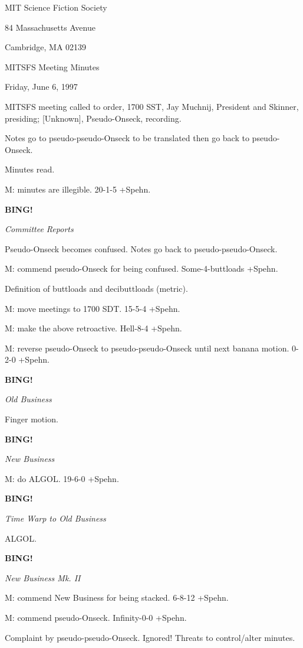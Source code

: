 \documentclass[12pt]{article}
\newcommand{\bing}{{\bf BING!} }
\newcommand{\goto}[1]{\bing \vskip 12pt \centerline{{\em{#1}}}}
\begin{document}
\begin{center}

MIT Science Fiction Society 

84 Massachusetts Avenue

Cambridge, MA 02139

\vspace{12pt}

MITSFS Meeting Minutes 

Friday, June 6, 1997

\end{center}
 
\vspace{18pt}

\setlength{\parskip}{6pt}

\noindent
MITSFS meeting called to order, 1700 SST,
Jay Muchnij, President and Skinner, presiding; [Unknown], Pseudo-Onseck, recording.

Notes go to pseudo-pseudo-Onseck to be translated then go back to pseudo-Onseck.

Minutes read.

M: minutes are illegible. 20-1-5 +Spehn.

\goto{Committee Reports}

Pseudo-Onseck becomes confused. Notes go back to pseudo-pseudo-Onseck.

M: commend pseudo-Onseck for being confused. Some-4-buttloads +Spehn.

Definition of buttloads and decibuttloads (metric).

M: move meetings to 1700 SDT. 15-5-4 +Spehn.

M: make the above retroactive. Hell-8-4 +Spehn.

M: reverse pseudo-Onseck to pseudo-pseudo-Onseck until next banana motion. 0-2-0 +Spehn.

\goto{Old Business}

Finger motion.

\goto{New Business}

M: do ALGOL. 19-6-0 +Spehn.

\goto{Time Warp to Old Business}

ALGOL.

\goto{New Business Mk. II}

M: commend New Business for being stacked. 6-8-12 +Spehn.

M: commend pseudo-Onseck. Infinity-0-0 +Spehn.

Complaint by pseudo-pseudo-Onseck. Ignored! Threats to control/alter minutes.
\end{document}
